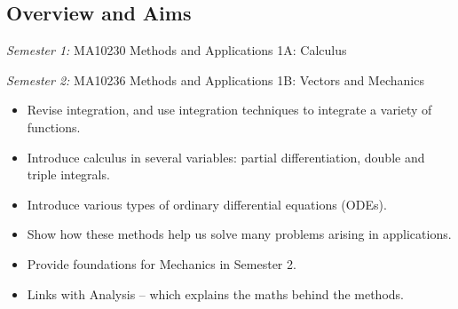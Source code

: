 \thispagestyle{plain}

\subsection*{Overview and Aims}

\emph{Semester 1:} MA10230 Methods and Applications 1A: Calculus

\emph{Semester 2:} MA10236 Methods and Applications 1B: Vectors and Mechanics

\begin{itemize}
\item Revise integration, and use integration techniques to integrate a variety of functions.
\item Introduce calculus in several variables: partial differentiation, double and triple integrals.
\item Introduce various types of ordinary differential equations (ODEs).
\item Show how these methods help us solve many problems arising in applications.
\item Provide foundations for Mechanics in Semester 2.
\item Links with Analysis -- which explains the maths behind the methods.
\end{itemize}

